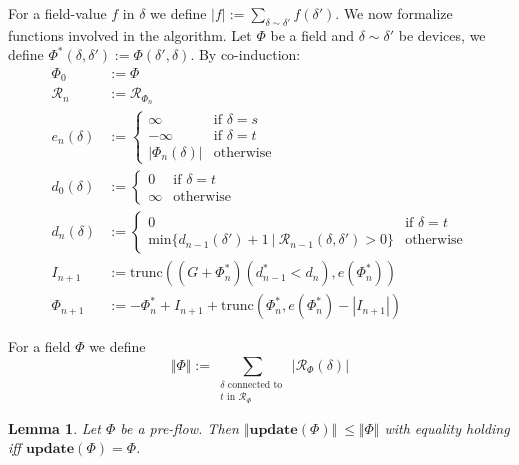 \documentclass{article}
\theoremstyle{plain}
\newtheorem{lem}[teo]{Lemma}
\theoremstyle{definition}
\theoremstyle{remark}
\begin{document}
For a field-value $f$ in $\delta$ we define $\displaystyle{|f|:=\sum_{\delta\sim\delta'}f(\delta')}$.
We now formalize functions involved in the algorithm. Let $\Phi$ be a field and $\delta\sim\delta'$ be  devices, we define $\Phi^*(\delta, \delta'):=\Phi(\delta', \delta)$.
By co-induction:
\begin{equation*}
\begin{split}
\Phi_0 &:= \Phi\\
\mathcal{R}_n&:= \mathcal{R}_{\Phi_n}\\
e_n(\delta)&:=
\begin{cases}
\infty &\text{if\ }\delta=s\\
-\infty &\text{if\ }\delta=t\\
|\Phi_n(\delta)| &\text{otherwise}
\end{cases}\\
d_0(\delta)&:=
\begin{cases} 
0 &\text{if\ }\delta=t\\
\infty&\text{otherwise}
\end{cases}\\
d_n(\delta)&:=
\begin{cases}
0 &\text{if\ }\delta=t\\
 \mathrm{min}\big\{d_{n-1}(\delta') + 1\ |\  \mathcal{R}_{n-1}(\delta, \delta')>0\big\}&\text{otherwise}
\end{cases}\\
I_{n+1}&:= \mathrm{trunc}((G + \Phi^*_n)(d_{n-1}^*<d_n),  e(\Phi_n^*))\\
\Phi_{n+1}&:= -\Phi_n^* + I_{n+1} + \mathrm{trunc}(\Phi_n^*, e(\Phi_n^*) - |I_{n+1}|)
\end{split}
\end{equation*}

For a field $\Phi$ we define 
\begin{equation*}
\Vert \Phi \Vert:=\sum_{\substack{\delta \text{ connected to } \\ t    \text{ in } \mathcal{R}_{\Phi}}}|\mathcal{R}_{\Phi}(\delta)|
\end{equation*}

\begin{lem}
Let $\Phi$ be a pre-flow. Then  $\Vert \textbf{update}(\Phi) \Vert\ \leq \Vert \Phi \Vert$ with equality holding iff $\textbf{update}(\Phi)=\Phi$.
\end{lem}
\end{document}
